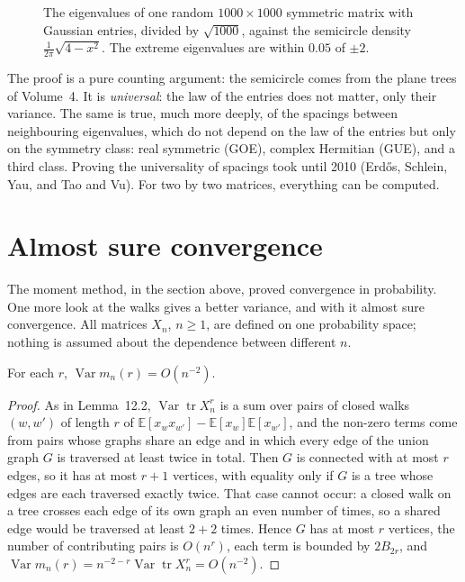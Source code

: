 \begin{figure}[ht]
\centering
{}
\caption{The eigenvalues of one random $1000\times1000$ symmetric matrix with Gaussian entries, divided by $\sqrt{1000}$, against the semicircle
density $\frac1{2\pi}\sqrt{4-x^2}$. The extreme eigenvalues are within $0.05$ of $\pm2$.}
\label{moments:fig:semicircle}
\end{figure}

The proof is a pure counting argument: the semicircle comes from the plane trees of Volume~4. It is \emph{universal}: the law of the entries does not
matter, only their variance. The same is true, much more deeply, of the spacings between neighbouring eigenvalues, which do not depend on the law of
the entries but only on the symmetry class: real symmetric (GOE), complex Hermitian (GUE), and a third class. Proving the universality of spacings
took until 2010 (Erd\H{o}s, Schlein, Yau, and Tao and Vu). For two by two matrices, everything can be computed.



\section{Almost sure convergence}

The moment method, in the section above, proved convergence in probability. One more look at the walks gives a better variance, and with it almost sure convergence. All matrices $X_n$, $n\ge1$, are defined on one probability space; nothing is assumed
about the dependence between different $n$.

\begin{proposition}\label{prop:varsharp}
For each $r$, $\operatorname{Var}m_n(r)=O(n^{-2})$.
\end{proposition}

\begin{proof}
As in Lemma~12.2, $\operatorname{Var}\operatorname{tr}X_n^r$ is a sum over pairs of closed walks $(w,w')$ of length $r$ of $\mathbb E[x_wx_{w'}]-\mathbb E[x_w]\mathbb E[x_{w'}]$, and the non-zero terms come from pairs whose graphs share an edge and
in which every edge of the union graph $G$ is traversed at least twice in total. Then $G$ is connected with at most $r$ edges, so it has at most $r+1$ vertices, with equality only if $G$ is a tree whose edges are each
traversed exactly twice. That case cannot occur: a closed walk on a tree crosses each edge of its own graph an even number of times, so a shared edge would be traversed at least $2+2$ times. Hence $G$ has at most $r$
vertices, the number of contributing pairs is $O(n^r)$, each term is bounded by $2B_{2r}$, and $\operatorname{Var}m_n(r)=n^{-2-r}\operatorname{Var}\operatorname{tr}X_n^r=O(n^{-2})$.
\end{proof}

